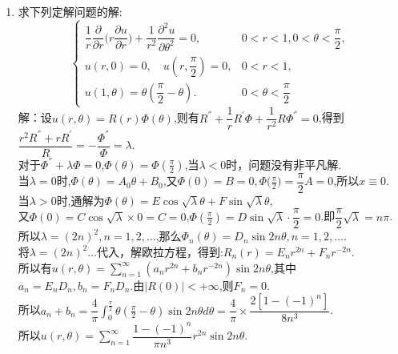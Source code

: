\documentclass[11pt]{article}
\begin{document}
\begin{enumerate}
    \item 求下列定解问题的解:
        \[
    \left\{
         \begin{array}{lr}
         \dfrac{1}{r}\dfrac{\partial}{\partial r}\big(r\dfrac{\partial u}{\partial r}\big)+\dfrac{1}{r^2}\dfrac{\partial^2 u}{\partial \theta^2}=0, & 0<r<1,0<\theta<\dfrac{\pi}{2},  \\[8pt]
         u(r,0)=0,\quad u(r,\dfrac{\pi}{2})=0,& 0<r<1, \\
         u(1,\theta)=\theta(\dfrac{\pi}{2}-\theta).&0<\theta<\dfrac{\pi}{2}
         \end{array}
        \right. \]
    解：设$u(r,\theta)=R(r)\varPhi(\theta)$,则有$R^{''}+\dfrac{1}{r}R^{'}\varPhi+\dfrac{1}{r^2}R\varPhi^{''}=0$,得到$\dfrac{r^{2}R^{''}+rR^{'}}{R}=-\dfrac{\varPhi^{''}}{\varPhi}=\lambda$.\\对于$\varPhi^{''}+\lambda\varPhi=0$,$\varPhi(\theta)=\varPhi(\frac{\pi}{2})$,当$\lambda <0$时，问题没有非平凡解.\\当$\lambda =0$时,$\varPhi(\theta)=A_0\theta+B_0$,又$\varPhi(0)=B=0,\varPhi\big(\frac{\pi}{2}\big)=\dfrac{\pi}{2}A=0$,所以$x\equiv 0$.\\当$\lambda>0$时,通解为$\varPhi(\theta)=E\cos\sqrt {\lambda}\theta+F\sin\sqrt {\lambda}\theta$,\\又$\varPhi(0)=C\cos\sqrt {\lambda}\times 0=C=0$,$\varPhi(\frac{\pi}{2})=D\sin\sqrt {\lambda}\cdot \dfrac{\pi}{2}=0$.即$\dfrac{\pi}{2}\sqrt {\lambda}=n\pi$.\\所以$\lambda=(2n)^2,n=1,2,\dots$,那么$\varPhi_n(\theta)=D_n\sin 2n\theta,n=1,2,\dots$.\\将$\lambda=(2n)^2\dots$代入，解欧拉方程，得到:$R_n(r)=E_{n}r^{2n}+F_{n}r^{-2n}$.\\
        所以有$u(r,\theta)=\sum\limits^{\infty}_{n=1}(a_{n}r^{2n}+b_{n}r^{-2n})\sin 2n\theta$,其中$a_n=E_{n}D_n,b_n=F_{n}D_n$.由$|R(0)|<+\infty$,则$F_n=0$.\\所以$a_n+b_n=\dfrac{4}{\pi}\int^{\frac{\pi}{2}}_{0}\theta(\frac{\pi}{2}-\theta)\sin 2n\theta d\theta=\dfrac{4}{\pi}\times \dfrac{2[1-(-1)^n]}{8n^3}$.\\所以$u(r,\theta)=\sum\limits_{n=1}^{\infty}\dfrac{1-(-1)^n}{\pi n^3}r^{2n}\sin 2n\theta  $.

\end{enumerate}
\setlength{\topmargin}{-18mm}
\end{document}
